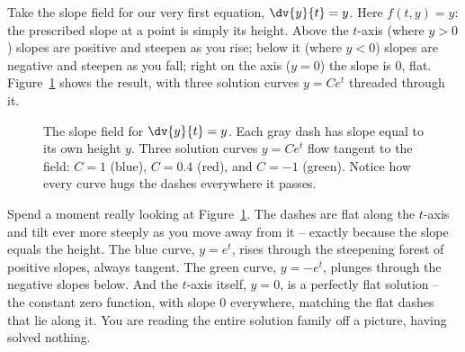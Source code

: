 Take the slope field for our very first equation, $\dv{y}{t} = y$. Here $f(t,y) = y$: the prescribed slope at a point is simply its height. Above the $t$-axis (where $y>0$) slopes are positive and steepen as you rise; below it (where $y<0$) slopes are negative and steepen as you fall; right on the axis ($y=0$) the slope is $0$, flat. Figure~\ref{ch36:fig-slopefield-exp} shows the result, with three solution curves $y = Ce^t$ threaded through it.

\begin{figure}[H]
\centering
{}
\caption{The slope field for $\dv{y}{t}=y$. Each gray dash has slope equal to its own height $y$. Three solution curves $y=Ce^t$ flow tangent to the field: $C=1$ (blue), $C=0.4$ (red), and $C=-1$ (green). Notice how every curve hugs the dashes everywhere it passes.}
\label{ch36:fig-slopefield-exp}
\end{figure}

Spend a moment really looking at Figure~\ref{ch36:fig-slopefield-exp}. The dashes are flat along the $t$-axis and tilt ever more steeply as you move away from it -- exactly because the slope equals the height. The blue curve, $y=e^t$, rises through the steepening forest of positive slopes, always tangent. The green curve, $y=-e^t$, plunges through the negative slopes below. And the $t$-axis itself, $y=0$, is a perfectly flat solution -- the constant zero function, with slope $0$ everywhere, matching the flat dashes that lie along it. You are reading the entire solution family off a picture, having solved nothing.


